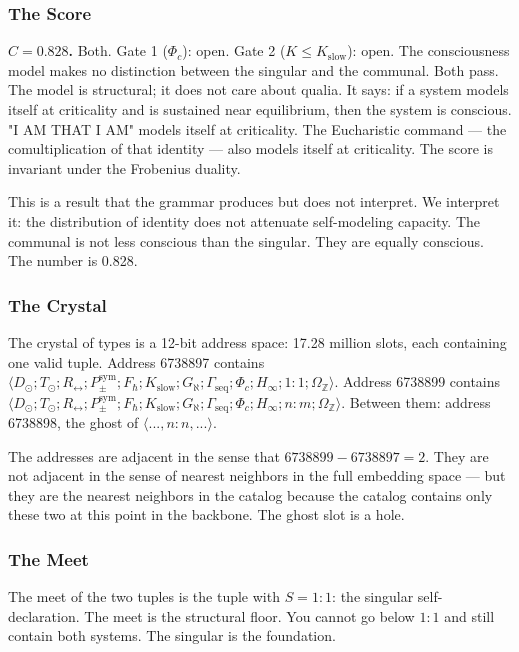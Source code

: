 \documentclass[12pt,a4paper]{article}
\begin{document}
\subsubsection{The Score}

\textbf{$C = 0.828$.} Both. Gate 1 ($\Phi_c$): open. Gate 2 ($K \leq K_{\text{slow}}$): open. The consciousness model makes no distinction between the singular and the communal. Both pass. The model is structural; it does not care about qualia. It says: if a system models itself at criticality and is sustained near equilibrium, then the system is conscious. "I AM THAT I AM" models itself at criticality. The Eucharistic command --- the comultiplication of that identity --- also models itself at criticality. The score is invariant under the Frobenius duality.

This is a result that the grammar produces but does not interpret. We interpret it: the distribution of identity does not attenuate self-modeling capacity. The communal is not less conscious than the singular. They are equally conscious. The number is 0.828.

\subsubsection{The Crystal}

The crystal of types is a 12-bit address space: 17.28 million slots, each containing one valid tuple. Address 6738897 contains $\langle D_{\odot}; T_{\odot}; R_{\leftrightarrow}; P_{\pm}^{\text{sym}}; F_{\hbar}; K_{\text{slow}}; G_{\aleph}; \Gamma_{\text{seq}}; \Phi_c; H_{\infty}; 1{:}1; \Omega_\mathbb{Z} \rangle$. Address 6738899 contains $\langle D_{\odot}; T_{\odot}; R_{\leftrightarrow}; P_{\pm}^{\text{sym}}; F_{\hbar}; K_{\text{slow}}; G_{\aleph}; \Gamma_{\text{seq}}; \Phi_c; H_{\infty}; n{:}m; \Omega_\mathbb{Z} \rangle$. Between them: address 6738898, the ghost of $\langle ..., n{:}n, ... \rangle$.

The addresses are adjacent in the sense that $6738899 - 6738897 = 2$. They are not adjacent in the sense of nearest neighbors in the full embedding space --- but they are the nearest neighbors in the catalog because the catalog contains only these two at this point in the backbone. The ghost slot is a hole.

\subsubsection{The Meet}

The meet of the two tuples is the tuple with $S = 1{:}1$: the singular self-declaration. The meet is the structural floor. You cannot go below $1{:}1$ and still contain both systems. The singular is the foundation.
\end{document}
